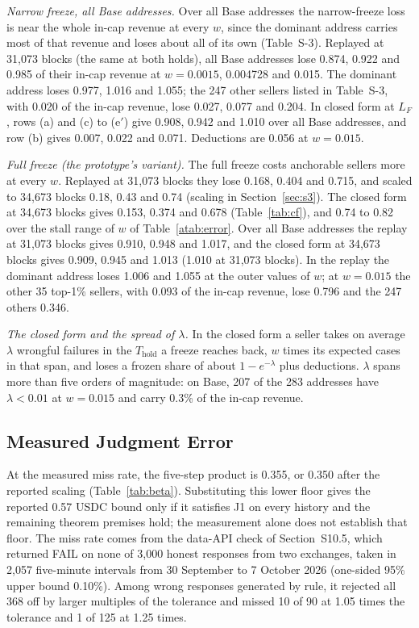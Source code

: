 \documentclass[10pt,a4paper]{article}
\newcommand{\Thold}{T_{\mathrm{hold}}}
\theoremstyle{plain}
\theoremstyle{remark}
\begin{document}
\emph{Narrow freeze, all Base addresses.} Over all Base addresses the narrow-freeze loss is near the whole in-cap revenue at every $w$, since the dominant address carries most of that revenue and loses about all of its own (Table~S-3). Replayed at 31,073 blocks (the same at both holds), all Base addresses lose 0.874, 0.922 and 0.985 of their in-cap revenue at $w=0.0015$, 0.004728 and 0.015. The dominant address loses 0.977, 1.016 and 1.055; the 247 other sellers listed in Table~S-3, with 0.020 of the in-cap revenue, lose 0.027, 0.077 and 0.204. In closed form at $L_F$, rows (a) and (c) to (e$'$) give 0.908, 0.942 and 1.010 over all Base addresses, and row (b) gives 0.007, 0.022 and 0.071. Deductions are 0.056 at $w=0.015$.

\emph{Full freeze (the prototype's variant).} The full freeze costs anchorable sellers more at every $w$. Replayed at 31,073 blocks they lose 0.168, 0.404 and 0.715, and scaled to 34,673 blocks 0.18, 0.43 and 0.74 (scaling in Section~\ref{sec:s3}). The closed form at 34,673 blocks gives 0.153, 0.374 and 0.678 (Table~\ref{tab:cf}), and 0.74 to 0.82 over the stall range of $w$ of Table~\ref{atab:error}. Over all Base addresses the replay at 31,073 blocks gives 0.910, 0.948 and 1.017, and the closed form at 34,673 blocks gives 0.909, 0.945 and 1.013 (1.010 at 31,073 blocks). In the replay the dominant address loses 1.006 and 1.055 at the outer values of $w$; at $w=0.015$ the other 35 top-1\% sellers, with 0.093 of the in-cap revenue, lose 0.796 and the 247 others 0.346.

\emph{The closed form and the spread of $\lambda$.} In the closed form a seller takes on average $\lambda$ wrongful failures in the $\Thold$ a freeze reaches back, $w$ times its expected cases in that span, and loses a frozen share of about $1-e^{-\lambda}$ plus deductions. $\lambda$ spans more than five orders of magnitude: on Base, 207 of the 283 addresses have $\lambda<0.01$ at $w=0.015$ and carry 0.3\% of the in-cap revenue.

\subsection{Measured Judgment Error}
\label{sec:measured}

At the measured miss rate, the five-step product is 0.355, or 0.350 after the reported scaling (Table~\ref{tab:beta}). Substituting this lower floor gives the reported 0.57 USDC bound only if it satisfies J1 on every history and the remaining theorem premises hold; the measurement alone does not establish that floor. The miss rate comes from the data-API check of Section~S10.5, which returned FAIL on none of 3,000 honest responses from two exchanges, taken in 2,057 five-minute intervals from 30 September to 7 October 2026 (one-sided 95\% upper bound 0.10\%). Among wrong responses generated by rule, it rejected all 368 off by larger multiples of the tolerance and missed 10 of 90 at 1.05 times the tolerance and 1 of 125 at 1.25 times.
\end{document}
